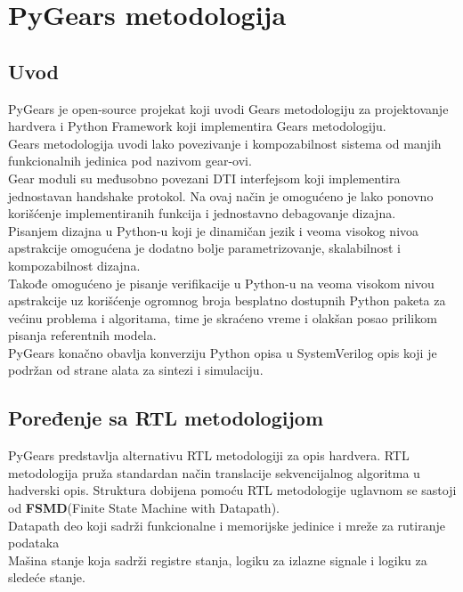 \section{PyGears metodologija} \label{pygears_sec}

\subsection{Uvod}

PyGears\cite{pygears_site} je open-source projekat koji uvodi Gears metodologiju za projektovanje
hardvera i Python Framework koji implementira Gears metodologiju. \\
Gears metodologija uvodi lako povezivanje i kompozabilnost sistema od manjih
funkcionalnih jedinica pod nazivom gear-ovi. \\
Gear moduli su međusobno povezani DTI interfejsom koji implementira jednostavan
handshake protokol.
Na ovaj način je omogućeno je lako ponovno korišćenje implementiranih funkcija i
jednostavno debagovanje dizajna. \\

Pisanjem dizajna u Python-u koji je dinamičan jezik i veoma visokog nivoa
apstrakcije omogućena je dodatno bolje parametrizovanje, skalabilnost i kompozabilnost dizajna. \\

Takođe omogućeno je pisanje verifikacije u Python-u na veoma visokom nivou
apstrakcije uz korišćenje ogromnog broja besplatno dostupnih Python paketa za
većinu problema i algoritama, time je skraćeno vreme i olakšan posao prilikom
pisanja referentnih modela. \\

PyGears konačno obavlja konverziju Python opisa u SystemVerilog opis koji
je podržan od strane alata za sintezi i simulaciju.

\subsection{Poređenje sa RTL metodologijom}

PyGears\cite{PyGears_OSDA} predstavlja alternativu RTL\cite{chu2006rtl} metodologiji za opis hardvera.
RTL metodologija pruža standardan način translacije sekvencijalnog algoritma u
hadverski opis.
Struktura dobijena pomoću RTL metodologije uglavnom se sastoji od \textbf{FSMD}(Finite
State Machine with Datapath). \\
Datapath deo koji sadrži funkcionalne i memorijske jedinice i
mreže za rutiranje podataka\cite{PSDS_5} \\
Mašina stanje koja sadrži registre stanja, logiku za izlazne signale i logiku za
sledeće stanje. \\

